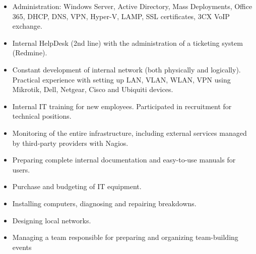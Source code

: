 \documentclass[10pt,a4paper]{altacv}
\begin{document}
\begin{itemize}
\item Administration: Windows Server, Active Directory, Mass Deployments, Office 365, DHCP, DNS, VPN, Hyper-V, LAMP, SSL certificates, 3CX VoIP exchange.
\item Internal HelpDesk (2nd line) with the administration of a ticketing system (Redmine).
\item Constant development of internal network (both physically and logically). Practical experience with setting up LAN, VLAN, WLAN, VPN using Mikrotik, Dell, Netgear, Cisco and Ubiquiti devices.
\item Internal IT training for new employees. Participated in recruitment for technical positions.
\item Monitoring of the entire infrastructure, including external services managed by third-party providers with Nagios.
\item Preparing complete internal documentation and easy-to-use manuals for users.
\item Purchase and budgeting of IT equipment.
\end{itemize}
\begin{itemize}
\item Installing computers, diagnosing and repairing breakdowns.
\item Designing local networks.
\end{itemize}
\begin{itemize}
\item Managing a team responsible for preparing and organizing team-building events
\end{itemize}

\divider
\end{document}
